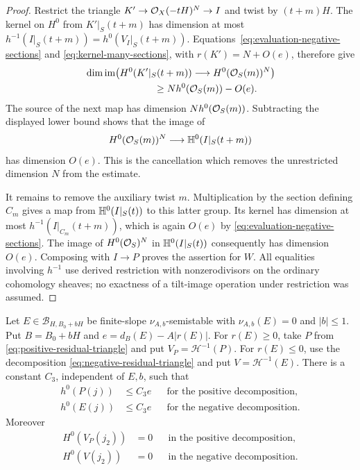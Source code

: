 \begin{proof}
Restrict the triangle $K'\to\mathcal O_X(-tH)^N\to I$ and twist by
$(t+m)H$.  The kernel on $H^0$ from $K'|_S(t+m)$ has dimension at
most
$h^{-1}(I|_S(t+m))=h^0(V_I|_S(t+m))$.
Equations~\eqref{eq:evaluation-negative-sections} and
\eqref{eq:kernel-many-sections}, with $r(K')=N+O(e)$, therefore
give
\[
 \begin{aligned}
 &\dim\im\!\left(
 H^0(K'|_S(t+m))\longrightarrow H^0(\OO_S(m))^N
 \right)\\
 &\hspace{25mm}\geq N h^0(\OO_S(m))-O(e).
 \end{aligned}
\]
The source of the next map has dimension $Nh^0(\mathcal O_S(m))$.
Subtracting the displayed lower bound shows that the image of
\[
 H^0(\mathcal O_S(m))^N\longrightarrow\mathbb H^0(I|_S(t+m))
\]
has dimension $O(e)$.  This is the cancellation which removes
the unrestricted dimension $N$ from the estimate.

It remains to remove the auxiliary twist $m$.
Multiplication by the section defining
$C_m$ gives a map from $\mathbb H^0(I|_S(t))$ to this latter group.
Its kernel has dimension at most
$h^{-1}(I|_{C_m}(t+m))$, which is again $O(e)$ by
\eqref{eq:evaluation-negative-sections}.  The image of
$H^0(\mathcal O_S)^N$ in $\mathbb H^0(I|_S(t))$ consequently has dimension
$O(e)$.  Composing with $I\to P$ proves the assertion for $W$.
All equalities involving $h^{-1}$ use derived restriction with
nonzerodivisors on the ordinary cohomology sheaves; no exactness
of a tilt-image operation under restriction was assumed.
\end{proof}

\begin{corollary}\label{cor:residual-sections}
Let $E\in\mathcal B_{H,B_0+bH}$ be finite-slope
$\nu_{A,b}$-semistable with $\nu_{A,b}(E)=0$ and $|b|\leq1$.
Put $B=B_0+bH$ and $e=d_B(E)-A|r(E)|$.  For $r(E)\geq0$, take $P$ from
\eqref{eq:positive-residual-triangle} and put
$V_P=\mathcal H^{-1}(P)$.  For $r(E)\leq0$, use the decomposition
\eqref{eq:negative-residual-triangle} and put $V=\mathcal H^{-1}(E)$.
There is a constant $C_3$, independent of $E,b$, such that
\begin{equation}\label{eq:residual-sections}
 \begin{aligned}
 h^0(P(j))&\leq C_3e &&\text{for the positive decomposition},\\
 h^0(E(j))&\leq C_3e &&\text{for the negative decomposition}.
 \end{aligned}
\end{equation}
Moreover
\begin{equation}\label{eq:negative-cohomology-vanishing}
 \begin{aligned}
 H^0(V_P(j_2))&=0&&\text{in the positive decomposition},\\
 H^0(V(j_2))&=0&&\text{in the negative decomposition}.
 \end{aligned}
\end{equation}
\end{corollary}

